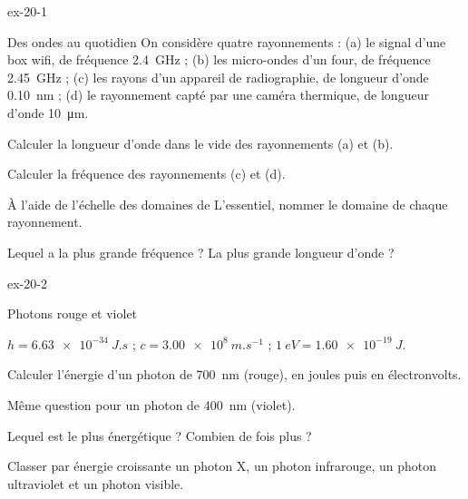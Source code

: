 \begin{blocLivre}{ex-20-1}
\begin{exercice}[1]{Des ondes au quotidien}
On considère quatre rayonnements : (a) le signal d'une box wifi, de fréquence \qty{2,4}{GHz} ; (b) les micro-ondes d'un four, de fréquence
\qty{2,45}{GHz} ; (c) les rayons d'un appareil de radiographie, de longueur d'onde \qty{0,10}{nm} ; (d) le rayonnement capté par une caméra
thermique, de longueur d'onde \qty{10}{\micro m}.
\begin{questions}
\item Calculer la longueur d'onde dans le vide des rayonnements (a) et (b).
\item Calculer la fréquence des rayonnements (c) et (d).
\item À l'aide de l'échelle des domaines de L'essentiel, nommer le domaine de chaque rayonnement.
\item Lequel a la plus grande fréquence ? La plus grande longueur d'onde ?
\end{questions}
\end{exercice}
\end{blocLivre}
\begin{blocLivre}{ex-20-2}
\begin{exercice}[1]{Photons rouge et violet}
\begin{donnees}
$h=\qty{6,63e-34}{J.s}$ ; $c=\qty{3,00e8}{m.s^{-1}}$ ; $\qty{1}{eV}=\qty{1,60e-19}{J}$.
\end{donnees}
\begin{questions}
\item Calculer l'énergie d'un photon de \qty{700}{nm} (rouge), en joules puis en électronvolts.
\item Même question pour un photon de \qty{400}{nm} (violet).
\item Lequel est le plus énergétique ? Combien de fois plus ?
\item Classer par énergie croissante un photon X, un photon infrarouge, un photon ultraviolet et un photon visible.
\end{questions}
\end{exercice}
\end{blocLivre}

